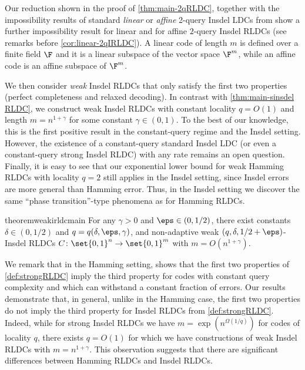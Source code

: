Our reduction shown in the proof of \cref{thm:main-2qRLDC},  together with the impossibility results of standard {\em linear} or {\em affine} 2-query Insdel LDCs from \cite{blocki2021exponential} show a further impossibility result for linear and for affine $2$-query Insdel RLDCs (see remarks before \cref{cor:linear-2qIRLDC}). A linear code of length $m$ is defined over a finite field $\F$ and it is a linear subspace of the vector space $\F^m$, while an affine code is an affine subspace of $\F^m$.
 
 
 We then consider {\em weak} Insdel RLDCs that only satisfy the first two properties (perfect completeness and relaxed decoding). In contrast with \cref{thm:main-sinsdel RLDC}, we construct weak Insdel RLDCs with constant locality $q=O(1)$ and length $m=n^{1+\gamma}$ for some constant $\gamma \in (0, 1)$. To the best of our knowledge, this is the first positive result in the constant-query regime and the Insdel setting. However, the existence of a constant-query standard Insdel LDC (or even a constant-query strong Insdel RLDC) with any rate remains an open question. Finally, it is easy to see that our exponential lower bound for weak Hamming RLDCs with locality $q=2$ still applies in the Insdel setting, since Insdel errors are more general than Hamming error. Thus, in the Insdel setting we discover the same ``phase transition''-type phenomena as for Hamming RLDCs.
 
 
 
 
\begin{restatable}{theorem}{weakirldcmain} \label{thm:main-rildc-construction}
	For any $\gamma>0$ and $\eps \in (0,1/2)$, there exist constants $\delta \in (0,1/2)$ and $q=q(\delta,\eps,\gamma)$, and non-adaptive weak $(q,\delta,1/2+\eps)$-Insdel RLDCs $C\colon\set{0,1}^n\rightarrow \set{0,1}^m$ with $m=O(n^{1+\gamma})$. %
\end{restatable}


 

 We remark that in the Hamming setting, \cite{Ben-SassonGHSV06} shows that the first two properties of \cref{def:strongRLDC} imply the third property for codes with constant query complexity and which can withstand a constant fraction of errors.
 Our results demonstrate that, in general, unlike in the Hamming case, the first two properties do not imply the third property for Insdel RLDCs from \cref{def:strongRLDC}. %
 Indeed, while for strong Insdel RLDCs we have $m= \exp(n^{\Omega(1/q)})$  for codes of locality $q$, there exists $q=O(1)$ for which we have constructions of weak Insdel RLDCs with $m=n^{1+\gamma}.$ This observation suggests that there are significant differences between Hamming RLDCs and Insdel RLDCs. 

